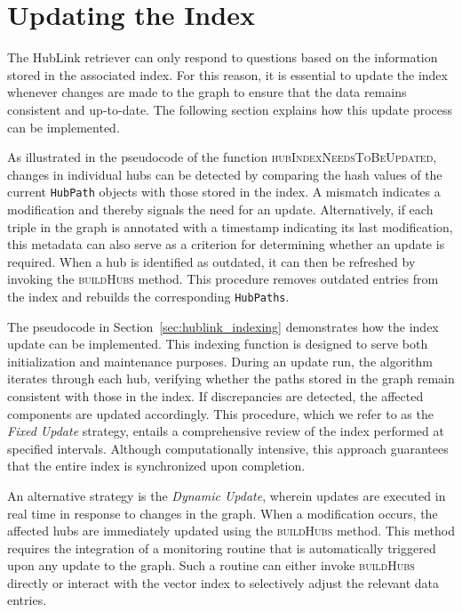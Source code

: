 
\section{Updating the Index}
\label{sec:updating_the_index}

The HubLink retriever can only respond to questions based on the information stored in the associated index. For this reason, it is essential to update the index whenever changes are made to the graph to ensure that the data remains consistent and up-to-date. The following section explains how this update process can be implemented.

As illustrated in the pseudocode of the function \textsc{hubIndexNeedsToBeUpdated}, changes in individual hubs can be detected by comparing the hash values of the current \texttt{HubPath} objects with those stored in the index. A mismatch indicates a modification and thereby signals the need for an update. Alternatively, if each triple in the graph is annotated with a timestamp indicating its last modification, this metadata can also serve as a criterion for determining whether an update is required. When a hub is identified as outdated, it can then be refreshed by invoking the \textsc{buildHubs} method. This procedure removes outdated entries from the index and rebuilds the corresponding \texttt{HubPaths}. 

The pseudocode in Section~\ref{sec:hublink_indexing} demonstrates how the index update can be implemented. This indexing function is designed to serve both initialization and maintenance purposes. During an update run, the algorithm iterates through each hub, verifying whether the paths stored in the graph remain consistent with those in the index. If discrepancies are detected, the affected components are updated accordingly. This procedure, which we refer to as the \emph{Fixed Update} strategy, entails a comprehensive review of the index performed at specified intervals. Although computationally intensive, this approach guarantees that the entire index is synchronized upon completion.

An alternative strategy is the \emph{Dynamic Update}, wherein updates are executed in real time in response to changes in the graph. When a modification occurs, the affected hubs are immediately updated using the \textsc{buildHubs} method. This method requires the integration of a monitoring routine that is automatically triggered upon any update to the graph. Such a routine can either invoke \textsc{buildHubs} directly or interact with the vector index to selectively adjust the relevant data entries.


